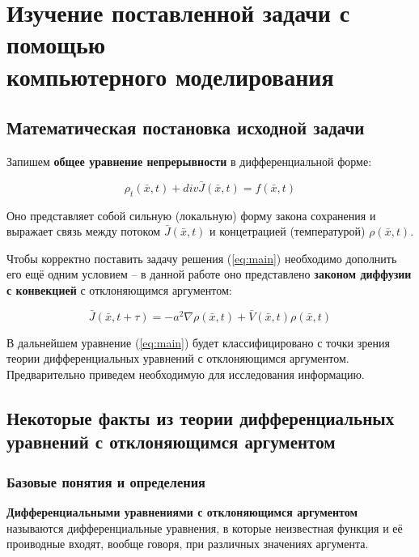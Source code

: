 \section{Изучение поставленной задачи с помощью\\компьютерного моделирования}

\subsection{Математическая постановка исходной задачи}

Запишем \textbf{общее уравнение непрерывности} в дифференциальной форме:

\begin{equation}\label{eq:main}
\rho_t(\bar{x},t) + div \bar{J}(\bar{x},t) = f(\bar{x},t)
\end{equation}

Оно представляет собой сильную (локальную) форму закона сохранения и выражает связь между потоком $\bar{J} (\bar{x},t)$ и концетрацией (температурой) $\rho(\bar{x},t)$.

Чтобы корректно поставить задачу решения (\ref{eq:main}) необходимо дополнить его ещё одним условием \--- в данной работе оно представлено \textbf{законом диффузии с конвекцией} с отклоняющимся аргументом:

\begin{equation}\label{eq:diffusion-convection}
\bar{J}(\bar{x},t+\tau) = -a^2 \nabla \rho(\bar{x},t) + \bar{V}(\bar{x},t) \rho(\bar{x},t)
\end{equation}

В дальнейшем уравнение (\ref{eq:main}) будет классифицировано с точки зрения теории дифференциальных уравнений с отклоняющимся аргументом. Предварительно приведем необходимую для исследования информацию.

\subsection{Некоторые факты из теории дифференциальных\\уравнений с отклоняющимся аргументом}

\subsubsection{Базовые понятия и определения}

\textbf{Дифференциальными уравнениями с отклоняющимся аргументом} называются дифференциальные уравнения, в которые неизвестная функция и её проиводные входят, вообще говоря, при различных значениях аргумента.

